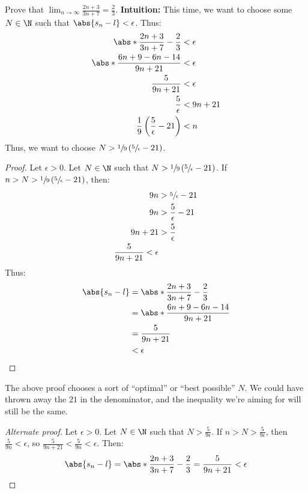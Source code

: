 \begin{exbox}{}{}
    Prove that $\lim_{n \to \infty} \frac{2n+3}{3n+7} = \frac{2}{3}$.
    \tcblower
    \textbf{Intuition:} This time, we want to choose some $N \in \N$ such that $\abs{s_n - l} < \epsilon$. Thus:
    \begin{align*}
        \abs*{\frac{2n+3}{3n+7} - \frac{2}{3}} &< \epsilon \\
        \abs*{\frac{6n+9-6n-14}{9n+21}} &< \epsilon \\
        \frac{5}{9n+21} &< \epsilon \\
        \frac{5}{\epsilon} &< 9n + 21 \\
        \frac{1}{9}\left( \frac{5}{\epsilon} - 21 \right) &< n
    \end{align*}
    Thus, we want to choose $N >  \sfrac{1}{9}\left( \sfrac{5}{\epsilon} - 21 \right)$.
    \begin{proof}
        Let $\epsilon > 0$. Let $N \in \N$ such that $N > \sfrac{1}{9}\left( \sfrac{5}{\epsilon} - 21 \right)$. If $n > N > \sfrac{1}{9}\left( \sfrac{5}{\epsilon} - 21 \right)$, then:
        \begin{align*}
            9n &> \sfrac{5}{\epsilon} - 21 \\
            9n &> \frac{5}{\epsilon} - 21 \\
            9n + 21 &> \frac{5}{\epsilon} \\
            \frac{5}{9n+21} < \epsilon
        \end{align*}
        Thus:
        \begin{align*}
            \abs{s_n-l} &= \abs*{\frac{2n+3}{3n+7} - \frac{2}{3}} \\
            &= \abs*{\frac{6n+9-6n-14}{9n+21}} \\
            &= \frac{5}{9n+21} \\
            &< \epsilon
        \end{align*}
    \end{proof}

    The above proof chooses a sort of ``optimal'' or ``best possible'' $N$. We could have thrown away the $21$ in the denominator, and the inequality we're aiming for will still be the same.
    \begin{proof}[Alternate proof]
        Let $\epsilon > 0$. Let $N \in \N$ such that $N > \frac{5}{9\epsilon}$. If $n > N > \frac{5}{9\epsilon}$, then $\frac{5}{9n} < \epsilon$, so $\frac{5}{9n+21} < \frac{5}{9n} < \epsilon$. Then:
        \[ \abs{s_n -l } = \abs*{\frac{2n+3}{3n+7} - \frac{2}{3}} = \frac{5}{9n+21} < \epsilon \]
    \end{proof}
\end{exbox}

